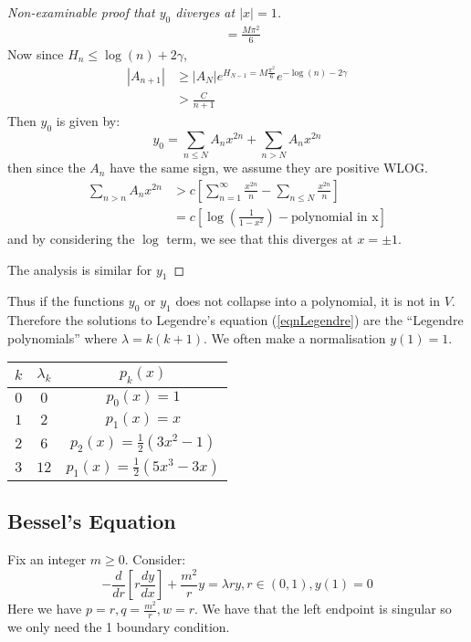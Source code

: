 \documentclass[../Main.tex]{subfiles}
\begin{document}
\begin{proof}[Non-examinable proof that $y_0$ diverges at $|x| = 1$]
\begin{align*}
        &= \frac{M\pi^2}{6}
    \end{align*}
    Now since $H_n \leq \log(n) + 2\gamma$,
    \begin{align*}
        |A_{n+1}| &\geq |A_N| e^{H_{N-1} = M\frac{\pi^2}{6}} e^{-\log(n) - 2\gamma} \\
        &> \frac{C}{n+1}
    \end{align*}       
    Then $y_0$ is given by:
    \begin{equation*}
        y_0 = \sum_{n \leq N} A_n x^{2n} + \sum_{n > N} A_nx^{2n}
    \end{equation*}
    then since the $A_n$ have the same sign, we assume they are positive WLOG.
    \begin{align*}
        \sum_{n > n} A_n x^{2n} &> c\left[\sum_{n=1}^\infty \frac{x^{2n}}{n} - \sum_{n \leq N}  \frac{x^{2n}}{n}\right] \\
        &= c\left[\log\left(\frac{1}{1-x^2}\right) - \text{polynomial in x}\right]
    \end{align*}
    and by considering the $\log$ term, we see that this diverges at $x = \pm 1$.

    The analysis is similar for $y_1$
\end{proof}
Thus if the functions $y_0$ or $y_1$ does not collapse into a polynomial, it is not in $V$. Therefore the solutions to Legendre's equation (\ref{eqnLegendre}) are the ``Legendre polynomials'' where $\lambda = k(k+1)$. We often make a normalisation $y(1) = 1$.

\begin{tabular}{|c|c|c|}
    \hline
    $k$ & $\lambda_k$ & $p_k(x)$ \\
    \hline
    $0$ & $0$ & $p_0(x) = 1$ \\
    $1$ & $2$ & $p_1(x) = x$ \\
    $2$ & $6$ & $p_2(x) = \frac12(3x^2-1)$ \\
    $3$ & $12$ & $p_1(x) = \frac12(5x^3-3x)$ \\
    \hline
\end{tabular}
\subsection{Bessel's Equation}
Fix an integer $m \geq 0$. Consider:
\begin{equation}
    -\frac{d}{dr} \left[r \frac{dy}{dx}\right] + \frac{m^2}{r}y = \lambda r y, r \in (0, 1), y(1) = 0
    \label{eqnBesselSL}
\end{equation}
Here we have $p = r, q = \frac{m^2}{r}, w = r$. We have that the left endpoint is singular so we only need the 1 boundary condition.
\end{document}
